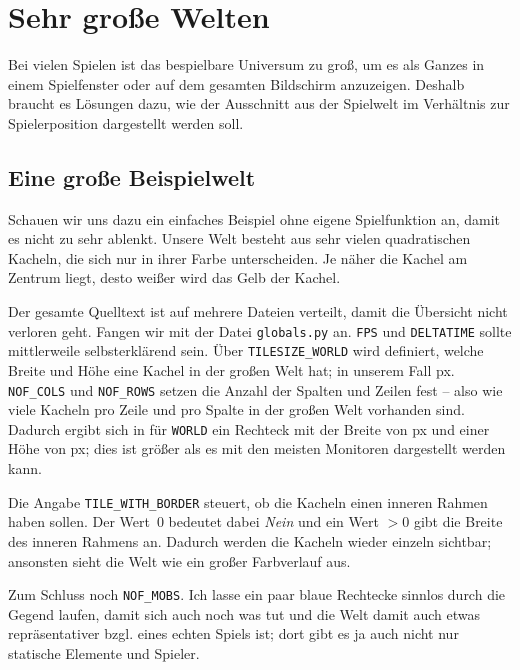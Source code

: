 \newpage
\section{Sehr große Welten}

Bei vielen Spielen ist das bespielbare Universum zu groß, um es als Ganzes in einem Spielfenster oder auf dem gesamten Bildschirm anzuzeigen. Deshalb braucht es Lösungen dazu, wie der Ausschnitt aus der Spielwelt im Verhältnis zur Spielerposition dargestellt werden soll.

\subsection{Eine große Beispielwelt}
Schauen wir uns dazu ein einfaches Beispiel ohne eigene Spielfunktion an, damit es nicht zu sehr ablenkt. Unsere Welt besteht aus sehr vielen quadratischen Kacheln, die sich nur in ihrer Farbe unterscheiden. Je näher die Kachel am Zentrum liegt, desto weißer wird das Gelb der Kachel.

Der gesamte Quelltext ist auf mehrere Dateien verteilt, damit die Übersicht nicht verloren geht. Fangen wir mit der Datei \texttt{globals.py} an. \texttt{FPS} und \texttt{DELTATIME} sollte mittlerweile selbsterklärend sein. Über \texttt{TILESIZE\_WORLD} wird definiert, welche Breite und Höhe eine Kachel in der großen Welt hat; in unserem Fall \unit[24]{px}. \texttt{NOF\_COLS} und \texttt{NOF\_ROWS} setzen die Anzahl der Spalten und Zeilen fest -- also wie viele Kacheln pro Zeile und pro Spalte in der großen Welt vorhanden sind. Dadurch ergibt sich in  für \texttt{WORLD} ein Rechteck mit der Breite von \unit[2160]{px} und einer Höhe von \unit[1680]{px}; dies ist größer als es mit den meisten Monitoren dargestellt werden kann.

Die Angabe \texttt{TILE\_WITH\_BORDER} steuert, ob die Kacheln einen inneren Rahmen haben sollen. Der Wert~0 bedeutet dabei \emph{Nein} und ein Wert $>0$ gibt die Breite des inneren Rahmens an. Dadurch werden die Kacheln wieder einzeln sichtbar; ansonsten sieht die Welt wie ein großer Farbverlauf aus.

Zum Schluss noch \texttt{NOF\_MOBS}. Ich lasse ein paar blaue Rechtecke sinnlos durch die Gegend laufen, damit sich auch noch was tut und die Welt damit auch etwas repräsentativer bzgl. eines echten Spiels ist; dort gibt es ja auch nicht nur statische Elemente und Spieler.

